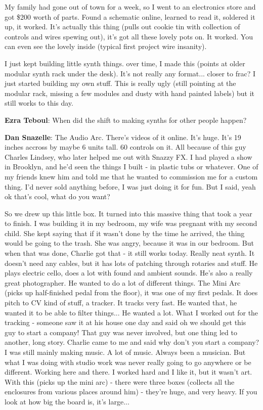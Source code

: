 My family had gone out of town for a week, so I went to an electronics store and got \$200 worth of parts. Found a schematic online, learned to read it, soldered it up, it worked. It's actually this thing (pulls out cookie tin with collection of controls and wires spewing out), it's got all these lovely pots on. It worked. You can even see the lovely inside (typical first project wire insanity). 

I just kept building little synth things. over time, I made this (points at older modular synth rack under the desk). It's not really any format... closer to frac? I just started building my own stuff. This is really ugly (still pointing at the modular rack, missing a few modules and dusty with hand painted labels) but it still works to this day. 

\textbf{Ezra Teboul}: When did the shift to making synths for other people happen? 

\textbf{Dan Snazelle}: The Audio Arc. There's videos of it online. It's huge. It's 19 inches accross by maybe 6 units tall. 60 controls on it. All because of this guy Charles Lindsey, who later helped me out with Snazzy FX. I had played a show in Brooklyn, and he'd seen the things I built - in plastic tubs or whatever. One of my friends knew him and told me that he wanted to commission me for a custom thing. I'd never sold anything before, I was just doing it for fun.  But I said, yeah ok that's cool, what do you want? 

So we drew up this little box. It turned into this massive thing that took a year to finish. I was building it in my bedroom, my wife was pregnant with my second child. She kept saying that if it wasn't done by the time he arrived, the thing would be going to the trash. She was angry, because it was in our bedroom. But when that was done, Charlie got that - it still works today. Really neat synth. It doesn't need any cables, but it has lots of patching through rotaries and stuff. He plays electric cello, does a lot with found and ambient sounds. He's also a really great photographer. He wanted to do a lot of different things. The Mini Arc (picks up half-finished pedal from the floor), it was one of my first pedals. It does pitch to CV kind of stuff, a tracker. It tracks very fast. He wanted that, he wanted it to be able to filter things... He wanted a lot. What I worked out for the tracking - someone saw it at his house one day and said oh we should get this guy to start a company! That guy was never involved, but one thing led to another, long story. Charlie came to me and said why don't you start a company? I was still mainly making music. A lot of music. Always been a musician. But what I was doing with studio work was never really going to go anywhere or be different. Working here and there. I worked hard and I like it, but it wasn't art. With this (picks up the mini arc) - there were three boxes (collects all the enclosures from various places around him) - they're huge, and very heavy. If you look at how big the board is, it's large... 

